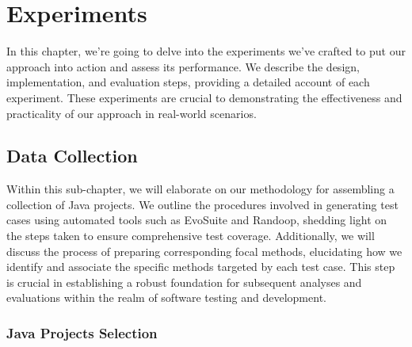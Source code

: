 \chapter{Experiments}
\label{cha:experiments}
\vspace{0.4 cm}

In this chapter, we're going to delve into the experiments we've crafted to put our approach into action and assess its performance. We describe the design, implementation, and evaluation steps, providing a detailed account of each experiment. These experiments are crucial to demonstrating the effectiveness and practicality of our approach in real-world scenarios.

\section{Data Collection}
\label{sec:data_collection}
\vspace{0.2 cm}
Within this sub-chapter, we will elaborate on our methodology for assembling a collection of Java projects. We outline the procedures involved in generating test cases using automated tools such as EvoSuite and Randoop\cite{noauthor_randoop_nodate}, shedding light on the steps taken to ensure comprehensive test coverage. Additionally, we will discuss the process of preparing corresponding focal methods, elucidating how we identify and associate the specific methods targeted by each test case. This step is crucial in establishing a robust foundation for subsequent analyses and evaluations within the realm of software testing and development.

\vspace{0.1 cm}
\subsection{Java Projects Selection}
\label{sec:projects_selection}
\vspace{0.1 cm}

